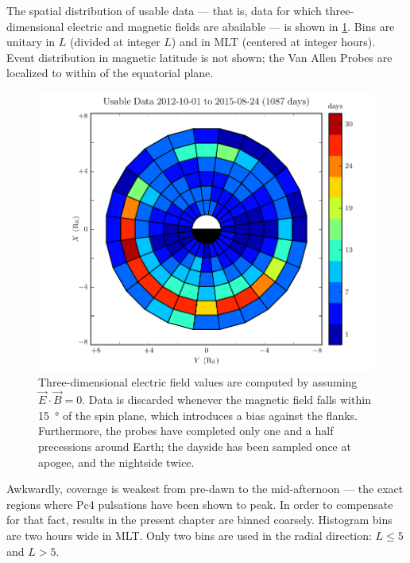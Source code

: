 The spatial distribution of usable data --- that is, data for which three-dimensional electric and magnetic fields are abailable --- is shown in \cref{fig_pos_all_sharp}. Bins are unitary in $L$ (divided at integer $L$) and in MLT (centered at integer hours). Event distribution in magnetic latitude is not shown; the Van Allen Probes are localized to within  of the equatorial plane. 


\begin{figure}[!htb]
    \centering
    \includegraphics[width=\textwidth]{figures/pos_all_sharp.pdf}
    \caption[Distribution of Usable Van Allen Probe Data: Fine Resolution]{
      Three-dimensional electric field values are computed by assuming $\vec{E} \cdot \vec{B} = 0$. Data is discarded whenever the magnetic field falls within \SI{15}{\degree} of the spin plane, which introduces a bias against the flanks. Furthermore, the probes have completed only one and a half precessions around Earth; the dayside has been sampled once at apogee, and the nightside twice. 
    }
    \label{fig_pos_all_sharp}
\end{figure}

Awkwardly, coverage is weakest from pre-dawn to the mid-afternoon --- the exact regions where Pc4 pulsations have been shown to peak. In order to compensate for that fact, results in the present chapter are binned coarsely. Histogram bins are two hours wide in MLT. Only two bins are used in the radial direction: $L \leq 5$ and $L > 5$. 

